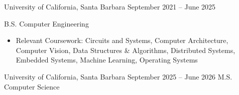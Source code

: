 \documentclass[9pt]{developercv} %
\begin{document}
\begin{entrylist}
    \vspace{-4pt}
    \entry
		{}
		{University of California, Santa Barbara}
		{September 2021 – June 2025}
		{B.S. Computer Engineering
        \begin{itemize}[noitemsep,topsep=0pt,parsep=0pt,partopsep=0pt, leftmargin=10pt]
            \item Relevant Coursework: Circuits and Systems, Computer Architecture, Computer Vision, Data Structures \& Algorithms, Distributed Systems, Embedded Systems, Machine Learning, Operating Systems
        \end{itemize}}
    \vspace{-4pt}
    \entry
        {}
        {University of California, Santa Barbara}
        {September 2025 – June 2026}
        {M.S. Computer Science}
\end{entrylist}
\vspace{-10pt}
\end{document}
